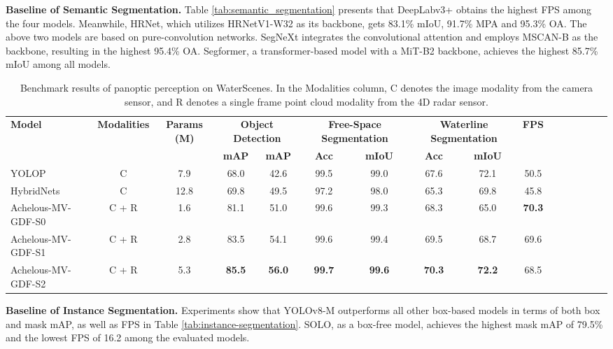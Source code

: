 \documentclass[lettersize,journal]{IEEEtran}
\begin{document}
\textbf{Baseline of Semantic Segmentation.} Table \ref{tab:semantic_segmentation} presents that DeepLabv3+ obtains the highest FPS among the four models. Meanwhile, HRNet, which utilizes HRNetV1-W32 as its backbone, gets 83.1\% mIoU, 91.7\% MPA and 95.3\% OA. The above two models are based on pure-convolution networks. 
SegNeXt integrates the convolutional attention and employs MSCAN-B as the backbone, resulting in the highest 95.4\% OA. 
Segformer, a transformer-based model with a MiT-B2 backbone, achieves the highest 85.7\% mIoU among all models.


\begin{table*}[!h]
\setlength\tabcolsep{5pt}
\caption{Benchmark results of panoptic perception on WaterScenes. In the Modalities column, C denotes the image modality from the camera sensor, and R denotes a single frame point cloud modality from the 4D radar sensor.}
\center
\footnotesize
\begin{tabular}{lccccccccccccccc}
\toprule
\multicolumn{1}{l}{\multirow{2}[2]{*}{\textbf{Model}}} & 
\multicolumn{1}{c}{\multirow{2}[2]{*}{\textbf{Modalities}}} &
\multicolumn{1}{c}{\multirow{2}[2]{*}{\textbf{Params (M)}}} &
\multicolumn{2}{c}{\bf{Object Detection}} &
\multicolumn{2}{c}{\bf{Free-Space Segmentation}} & 
\multicolumn{2}{c}{\bf{Waterline Segmentation}} & \multicolumn{1}{c}{\multirow{2}[2]{*}{\textbf{FPS}}}
  \\ \cmidrule(lr){4-5}\cmidrule(lr){6-7}\cmidrule(lr){8-9}
\multicolumn{3}{c}{} & \bf{mAP} & \bf{mAP} & \bf{Acc} & \bf{mIoU} & \bf{Acc} & \bf{mIoU}      
\\\midrule
YOLOP \cite{wu2022yolop} & C & 7.9 & 68.0 & 42.6 & 99.5 & 99.0 & 67.6 & 72.1 & 50.5 \\\midrule
HybridNets \cite{vu2022hybridnets} & C & 12.8 & 69.8 & 49.5 & 97.2 & 98.0 & 65.3 & 69.8 & 45.8\\\midrule
Achelous-MV-GDF-S0 \cite{guan2023achelous} & C + R & 1.6 & 81.1 & 51.0 & 99.6 & 99.3 & 68.3 & 65.0 & \bf{70.3} \\\midrule
Achelous-MV-GDF-S1 \cite{guan2023achelous} & C + R & 2.8 & 83.5 & 54.1 & 99.6 & 99.4 & 69.5 & 68.7 & 69.6  \\\midrule
Achelous-MV-GDF-S2 \cite{guan2023achelous} & C + R & 5.3 & \bf{85.5} & \bf{56.0} & \bf{99.7} & \bf{99.6} & \bf{70.3} & \bf{72.2} & 68.5  \\\midrule
\end{tabular}
\label{tab:multi-task}
\end{table*}


\textbf{Baseline of Instance Segmentation.} 
Experiments show that YOLOv8-M outperforms all other box-based models in terms of both box and mask mAP, as well as FPS in Table \ref{tab:instance-segmentation}. SOLO, as a box-free model, achieves the highest mask mAP of 79.5\% and the lowest FPS of 16.2 among the evaluated models.
\end{document}
